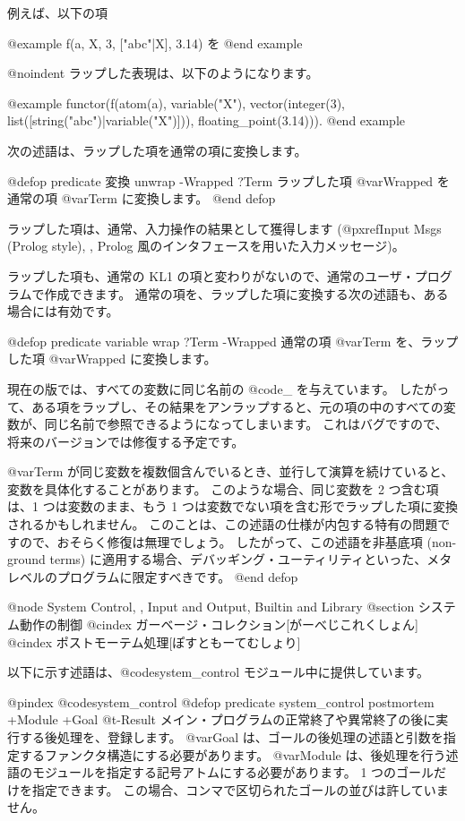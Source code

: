 {{{{例えば、以下の項

@example
f(a, X, {3, ["abc"|X]}, 3.14)  を
@end example

@noindent
ラップした表現は、以下のようになります。

@example
functor(f(atom(a),
        variable("X"),
        vector({integer(3), list([string("abc")|variable("X")])}),
        floating_point(3.14))).
@end example

次の述語は、ラップした項を通常の項に変換します。

@defop {predicate} {変換} unwrap -Wrapped ?Term
ラップした項 @var{Wrapped} を通常の項 @var{Term} に変換します。
@end defop

ラップした項は、通常、入力操作の結果として獲得します
(@pxref{Input Msgs (Prolog style), ,
Prolog 風のインタフェースを用いた入力メッセージ})。

ラップした項も、通常の KL1 の項と変わりがないので、通常のユーザ・プログラムで作成できます。
通常の項を、ラップした項に変換する次の述語も、ある場合には有効です。

@defop {predicate} {variable} wrap ?Term -Wrapped
通常の項 @var{Term} を、ラップした項 @var{Wrapped} に変換します。

現在の版では、すべての変数に同じ名前の @code{_} を与えています。
したがって、ある項をラップし、その結果をアンラップすると、元の項の中のすべての変数が、同じ名前で参照できるようになってしまいます。
これはバグですので、将来のバージョンでは修復する予定です。

@var{Term} が同じ変数を複数個含んでいるとき、並行して演算を続けていると、変数を具体化することがあります。
このような場合、同じ変数を 2 つ含む項は、1 つは変数のまま、もう 1 つは変数でない項を含む形でラップした項に変換されるかもしれません。
このことは、この述語の仕様が内包する特有の問題ですので、おそらく修復は無理でしょう。
したがって、この述語を非基底項 (non-ground terms) に適用する場合、デバッギング・ユーティリティといった、メタレベルのプログラムに限定すべきです。
@end defop

@node System Control,  , Input and Output, Builtin and Library
@section システム動作の制御
@cindex ガーベージ・コレクション[がーべじこれくしょん]
@cindex ポストモーテム処理[ぽすともーてむしょり] 

以下に示す述語は、@code{system_control} モジュール中に提供しています。

@pindex @code{system_control}
@defop {predicate} {system_control} postmortem +Module +Goal @t{-}Result
メイン・プログラムの正常終了や異常終了の後に実行する後処理を、登録します。
@var{Goal} は、ゴールの後処理の述語と引数を指定するファンクタ構造にする必要があります。 
@var{Module} は、後処理を行う述語のモジュールを指定する記号アトムにする必要があります。
1 つのゴールだけを指定できます。
この場合、コンマで区切られたゴールの並びは許していません。

}}}}
